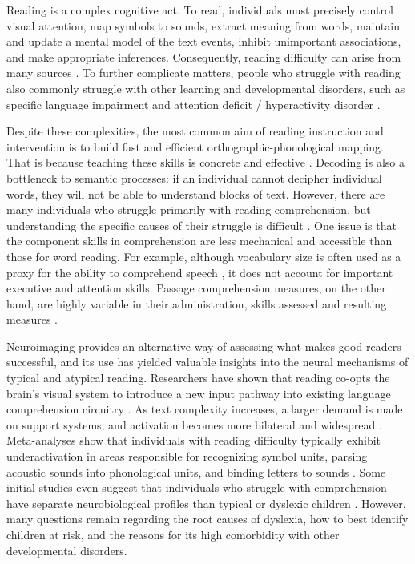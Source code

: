 Reading is a complex cognitive act. To read, individuals must precisely control visual attention, map symbols to sounds, extract meaning from words, maintain and update a mental model of the text events, inhibit unimportant associations, and make appropriate inferences. Consequently, reading difficulty can arise from many sources \citep{Pennington2009, vanderLely2010}. To further complicate matters, people who struggle with reading also commonly struggle with other learning and developmental disorders, such as specific language impairment and attention deficit / hyperactivity disorder \citep{Pennington2006, Margari2013}.

Despite these complexities, the most common aim of reading instruction and intervention is to build fast and efficient orthographic-phonological mapping. That is because teaching these skills is concrete and effective \citep{NationalReadingPanel2000}. Decoding is also a bottleneck to semantic processes: if an individual cannot decipher individual words, they will not be able to understand blocks of text. However, there are many individuals who struggle primarily with reading comprehension, but understanding the specific causes of their struggle is difficult \citep{Cain2006}. One issue is that the component skills in comprehension are less mechanical and accessible than those for word reading. For example, although vocabulary size is often used as a proxy for the ability to comprehend speech \citep{Spencer2014}, it does not account for important executive and attention skills. Passage comprehension measures, on the other hand, are highly variable in their administration, skills assessed and resulting measures \citep{Cutting2009a}.

Neuroimaging provides an alternative way of assessing what makes good readers successful, and its use has yielded valuable insights into the neural mechanisms of typical and atypical reading. Researchers have shown that reading co-opts the brain's visual system to introduce a new input pathway into existing language comprehension circuitry \citep{Jobard2007}. As text complexity increases, a larger demand is made on support systems, and activation becomes more bilateral and widespread \citep{Xu2005}.  Meta-analyses show that individuals with reading difficulty typically exhibit underactivation in areas responsible for recognizing symbol units, parsing acoustic sounds into phonological units, and binding letters to sounds \citep{Maisog2008, Richlan2009, Paulesu2014}. Some initial studies even suggest that individuals who struggle with comprehension have separate neurobiological profiles than typical or dyslexic children \citep{Bailey2016}. However, many questions remain regarding the root causes of dyslexia, how to best identify children at risk, and the reasons for its high comorbidity with other developmental disorders. 

